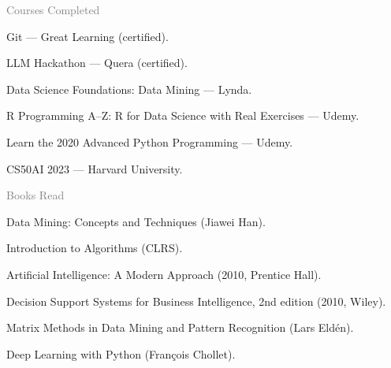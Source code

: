 \documentclass[a4paper]{deedy-resume}
\begin{document}
\begin{minipage}[t]{0.62\textwidth}
\textcolor{gray}{\huge{Courses Completed}}
\vspace{\itemsep}
\begin{tightitemize}
\item Git — Great Learning (certified).
\item LLM Hackathon — Quera (certified).
\item Data Science Foundations: Data Mining — Lynda.
\item R Programming A–Z: R for Data Science with Real Exercises — Udemy.
\item Learn the 2020 Advanced Python Programming — Udemy.
\item CS50AI 2023 — Harvard University.
\end{tightitemize}
\sectionspace

\textcolor{gray}{\huge{Books Read}}
\vspace{\itemsep}
\begin{tightitemize}
\item Data Mining: Concepts and Techniques (Jiawei Han).
\item Introduction to Algorithms (CLRS).
\item Artificial Intelligence: A Modern Approach (2010, Prentice Hall).
\item Decision Support Systems for Business Intelligence, 2nd edition (2010, Wiley).
\item Matrix Methods in Data Mining and Pattern Recognition (Lars Eldén).
\item Deep Learning with Python (François Chollet).
\end{tightitemize}

\end{minipage}
\hfill
\end{document}
